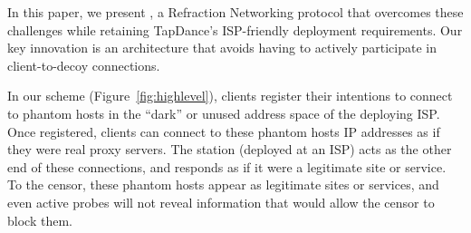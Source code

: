 \documentclass[sigconf,anonymous]{acmart}
\newcommand{\TODO}[1]{\hl{TODO: #1}\xspace}
\begin{document}



\smallskip

In this paper, we present \textbf{\scheme}, a Refraction
Networking protocol that overcomes these challenges while retaining
TapDance's ISP-friendly deployment requirements.
Our key innovation is an architecture that avoids
having to actively participate in client-to-decoy connections.

In our scheme (Figure~\ref{fig:highlevel}), clients
register their intentions to connect to phantom hosts in the ``dark''
or unused address space of the deploying ISP. Once registered, clients
can connect to these phantom hosts IP addresses as if they were real
proxy servers. The \scheme station (deployed at an ISP) acts as the other end of these connections, and
responds as if it were a legitimate site or service. To the censor,
these phantom hosts appear as legitimate sites or services, and even
active probes will not reveal information that would allow the censor to
block them.


\end{document}
